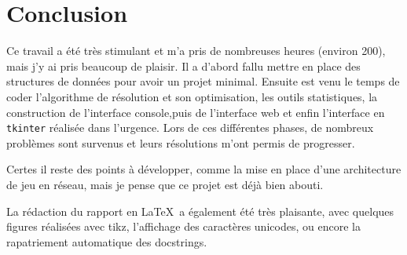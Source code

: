 \chapter{Conclusion}
Ce travail a été très stimulant et m'a pris de nombreuses heures (environ 200), mais j'y ai pris beaucoup de plaisir. Il a d'abord fallu mettre en place des structures de données pour avoir un projet minimal. Ensuite est venu le temps de coder l'algorithme de résolution et son optimisation, les outils statistiques, la construction de l'interface console,puis de l'interface web et enfin l'interface en \texttt{tkinter} réalisée dans l'urgence. Lors de ces différentes phases, de nombreux problèmes sont survenus et leurs résolutions m'ont permis de progresser.

Certes il reste des points à développer, comme la mise en place d'une architecture de jeu en réseau, mais je pense que ce projet est déjà bien abouti. 

La rédaction du rapport en \LaTeX\ a également été très plaisante, avec quelques figures réalisées avec tikz, l'affichage des caractères unicodes, ou encore la rapatriement automatique des docstrings. 
%
%
